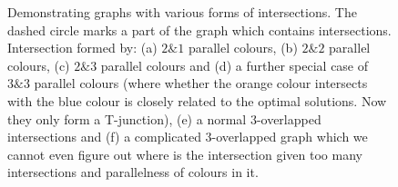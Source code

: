 \documentclass[conference]{IEEEtran}
\begin{document}
\begin{figure}[t]
\centering
\caption{Demonstrating graphs with various forms of intersections. 
The dashed circle marks a part of the graph which contains intersections. 
Intersection formed by: (a) $2\&1$ parallel colours, (b) $2\&2$ parallel colours, (c) $2\&3$ parallel colours and (d) a further special case of $3\&3$ parallel colours (where whether the orange colour intersects with the blue colour is closely related to the optimal solutions. Now they only form a T-junction), (e) a normal $3$-overlapped intersections and (f) a complicated $3$-overlapped graph which we cannot even figure out where is the intersection given too many intersections and parallelness of colours in it. }\label{fig:three_overlapped_graph}
\end{figure}

\end{document}

